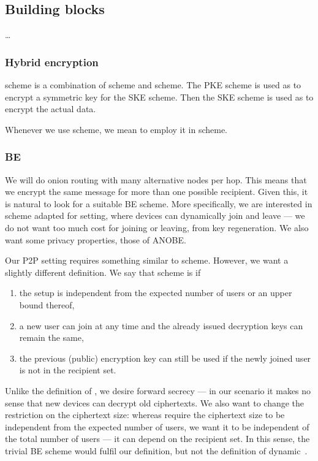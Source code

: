 \subsection{Building blocks}%
\label{BuildingBlocks}

\dots

\subsubsection{Hybrid encryption}\label{KEM}

 scheme is a combination of  scheme and  scheme.
The \ac{PKE} scheme is used as  to encrypt a symmetric key for the 
\ac{SKE} scheme.
Then the \ac{SKE} scheme is used as  to encrypt the actual data.

Whenever we use  scheme, we mean to employ it in  scheme.

\subsubsection{\Acl*{BE}}\label{BE}

We will do onion routing with many alternative nodes per hop.
This means that we encrypt the same message for more than one possible 
recipient.
Given this, it is natural to look for a suitable \ac{BE} scheme.
More specifically, we are interested in  scheme adapted for  
setting, where devices can dynamically join and leave --- \ie we do not want too 
much cost for joining or leaving, \eg from key regeneration.
We also want some privacy properties, \eg those of \ac{ANOBE}.

Our \ac{P2P} setting requires something similar to  scheme.
However, we want a slightly different definition.
We say that  scheme is  if
\begin{enumerate}
  \item the setup is independent from the expected number of users or an upper 
    bound thereof,
  \item a new user can join at any time and the already issued decryption keys 
    can remain the same,
  \item the previous (public) encryption key can still be used if the newly 
    joined user is not in the recipient set.
\end{enumerate}
Unlike the definition of \textcite{DynamicBroadcastEncryption}, we desire 
forward secrecy --- in our scenario it makes no sense that new devices can 
decrypt old ciphertexts.
We also want to change the restriction on the ciphertext size:
whereas \textcite{DynamicBroadcastEncryption} require the ciphertext size to be 
independent from the expected number of users, we want it to be independent of 
the total number of users --- \ie it can depend on the recipient set.
In this sense, the trivial \ac{BE} scheme would fulfil our definition, but not 
the definition of dynamic~\cite{DynamicBroadcastEncryption}.

